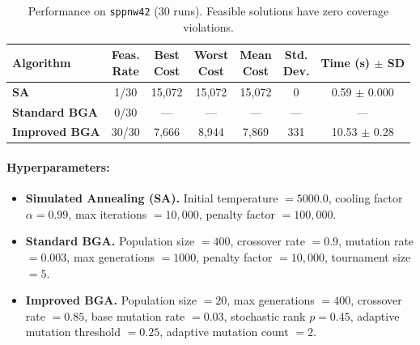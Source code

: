 \documentclass[12pt]{article}
\begin{document}
\begin{table}[htbp]
  \centering
  \label{tab:sppnw42}
  \renewcommand{\arraystretch}{1.1}
  \begin{tabular}{lcccccc}
    \hline
    \textbf{Algorithm} 
      & \makecell{Feas.\\Rate} 
      & \makecell{Best\\Cost} 
      & \makecell{Worst\\Cost} 
      & \makecell{Mean\\Cost} 
      & \makecell{Std.\\Dev.} 
      & \makecell{Time\\(s) $\pm$ SD}\\
    \hline
    \textbf{SA}          
      & 1/30 
      & 15,072
      & 15,072
      & 15,072
      & 0
      & 0.59 $\pm$ 0.000 \\
    \textbf{Standard BGA} 
      & 0/30
      & — 
      & —
      & —
      & —
      & — \\
    \textbf{Improved BGA} 
      & 30/30 
      & 7,666
      & 8,944
      & 7,869
      & 331
      & 10.53 $\pm$ 0.28 \\
    \hline
  \end{tabular}
  \caption{Performance on \texttt{sppnw42} (30 runs). Feasible solutions have zero coverage violations.}
\end{table}

\paragraph{Hyperparameters:}
\vspace{-1em}
\begin{itemize}
    \item \textbf{Simulated Annealing (SA).} 
    Initial temperature $= 5000.0$, 
    cooling factor $\alpha = 0.99$, 
    max iterations $= 10{,}000$, 
    penalty factor $= 100{,}000$. 
    \item \textbf{Standard BGA.}
    Population size $= 400$, 
    crossover rate $= 0.9$, 
    mutation rate $= 0.003$, 
    max generations $= 1000$, 
    penalty factor $= 10{,}000$, 
    tournament size $= 5$. 
    \item \textbf{Improved BGA.}
    Population size $= 20$, 
    max generations $= 400$, 
    crossover rate $= 0.85$, 
    base mutation rate $= 0.03$, 
    stochastic rank $p = 0.45$, 
    adaptive mutation threshold $= 0.25$, 
    adaptive mutation count $= 2$.
\end{itemize}
\end{document}
